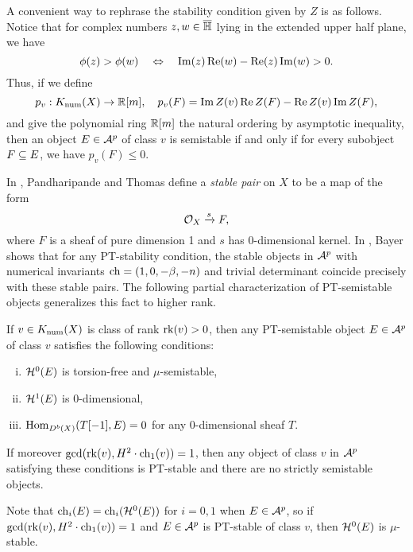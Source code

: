 A convenient way to rephrase the stability condition given by $Z$ is as follows. Notice that for complex numbers $z, w \in \overline{\mathbb{H}}$ lying in the extended upper half plane, we have
\[ \phi(z) > \phi(w) \quad \Leftrightarrow \quad  \operatorname{\mathrm{Im}}(z) \operatorname{\mathrm{Re}}(w) - \operatorname{\mathrm{Re}}(z) \operatorname{\mathrm{Im}}(w) > 0. \]
Thus, if we define
\begin{equation}\label{realvaluedcharge}
    p_v: K_{\mathrm{num}}(X) \to \mathbb{R}[m], \quad p_v(F) = \operatorname{\mathrm{Im}} Z(v) \operatorname{\mathrm{Re}} Z(F) - \operatorname{\mathrm{Re}} Z(v) \operatorname{\mathrm{Im}} Z(F),
\end{equation}
and give the polynomial ring $\mathbb{R}[m]$ the natural ordering by asymptotic inequality, then an object $E \in \mathcal{A}^p$ of class $v$ is semistable if and only if for every subobject $F \subseteq E$, we have $p_v(F) \le 0$.

In \cite{PT}, Pandharipande and Thomas define a \emph{stable pair} on $X$ to be a map of the form
\[ \mathcal{O}_X \xrightarrow{s} F, \]
where $F$ is a sheaf of pure dimension 1 and $s$ has $0$-dimensional kernel. In \cite[Proposition 6.1.1]{bayer-polynomial}, Bayer shows that for any PT-stability condition, the stable objects in $\mathcal{A}^p$ with numerical invariants $\operatorname{\mathrm{ch}} = (1, 0, -\beta, -n)$ and trivial determinant coincide precisely with these stable pairs. The following partial characterization of PT-semistable objects generalizes this fact to higher rank. 

\begin{prop}
    If $v \in K_{\mathrm{num}}(X)$ is class of rank $\operatorname{\mathrm{rk}}(v) > 0$, then any PT-semistable object $E \in \mathcal{A}^p$ of class $v$ satisfies the following conditions:
    \begin{enumerate}[(i)]
        \item $\mathcal{H}^0(E)$ is torsion-free and $\mu$-semistable,
        \item $\mathcal{H}^1(E)$ is 0-dimensional,
        \item $\mathrm{Hom}_{D^b(X)}(T[-1], E) = 0$ for any 0-dimensional sheaf $T$.
    \end{enumerate}
    If moreover $\gcd(\operatorname{\mathrm{rk}}(v), H^2 \cdot \operatorname{\mathrm{ch}}_1(v)) = 1$, then any object of class $v$ in $\mathcal{A}^p$ satisfying these conditions is PT-stable and there are no strictly semistable objects.
\end{prop}
Note that $\operatorname{\mathrm{ch}}_i(E) = \operatorname{\mathrm{ch}}_i(\mathcal{H}^0(E))$ for $i = 0, 1$ when $E \in \mathcal{A}^p$, so if $\gcd(\operatorname{\mathrm{rk}}(v), H^2 \cdot \operatorname{\mathrm{ch}}_1(v)) = 1$ and $E \in \mathcal{A}^p$ is PT-stable of class $v$, then $\mathcal{H}^0(E)$ is $\mu$-stable.

